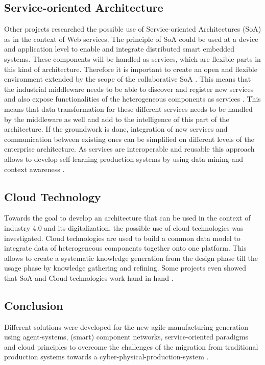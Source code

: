 \documentclass[conference,compsoc]{IEEEtran}
\begin{document}
\subsection{Service-oriented Architecture}
Other projects researched the possible use of Service-oriented Architectures (SoA) as in the context of Web services. The principle of SoA could be used at a device and application level to enable and integrate distributed smart embedded systems. These components will be handled as services, which are flexible parts in this kind of architecture. Therefore it is important to create an open and flexible environment extended by the scope of the collaborative SoA \cite{HarmonizedSystems}. This means that the industrial middleware needs to be able to discover and register new services and also expose functionalities of the heterogeneous components as services \cite{SpecPERFoRM}. This means that data transformation for these different services needs to be handled by the middleware as well and add to the intelligence of this part of the architecture. If the groundwork is done, integration of new services and communication between existing ones can be simplified on different levels of the enterprise architecture. As services are interoperable and reusable this approach allows to develop self-learning production systems by using data mining and context awareness \cite{HarmonizedSystems}.


\subsection{Cloud Technology}
Towards the goal to develop an architecture that can be used in the context of industry 4.0 and its digitalization, the possible use of cloud technologies was investigated. Cloud technologies are used to build a common data model to integrate data of heterogeneous components together onto one platform. This allows to create a systematic knowledge generation from the design phase till the usage phase by knowledge gathering and refining. Some projects even showed that SoA and Cloud technologies work hand in hand \cite{HarmonizedSystems}.  

\subsection{Conclusion}
Different solutions were developed for the new agile-manufacturing generation using agent-systems, (smart) component networks, service-oriented paradigms and cloud principles to overcome the challenges of the migration from traditional production systems towards a cyber-physical-production-system \cite{HarmonizedSystems}.
\end{document}
